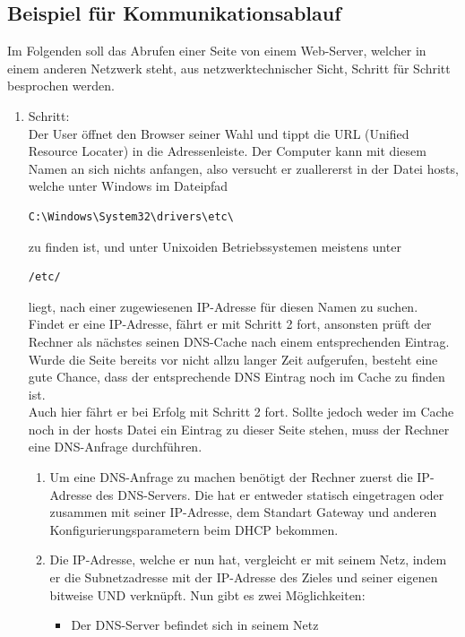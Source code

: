\documentclass[12pt,a4paper]{report}
\begin{document}
\begin{onehalfspace}
\subsection{Beispiel für Kommunikationsablauf}
Im Folgenden soll das Abrufen einer Seite von einem Web-Server, welcher in einem anderen Netzwerk steht, aus netzwerktechnischer Sicht, Schritt für Schritt besprochen werden.\\
\begin{enumerate}
\item Schritt:\\
Der User öffnet den Browser seiner Wahl und tippt die URL (Unified Resource Locater) in die Adressenleiste. Der Computer kann mit diesem Namen an sich nichts anfangen, also versucht er zuallererst in der Datei \glqq hosts\grqq , welche unter Windows im Dateipfad
\begin{lstlisting} 
C:\Windows\System32\drivers\etc\ 
\end{lstlisting} zu finden ist, und unter Unixoiden Betriebssystemen meistens unter 
\begin{lstlisting} 
/etc/
\end{lstlisting} liegt, nach einer zugewiesenen IP-Adresse für diesen Namen zu suchen.\\
Findet er eine IP-Adresse, fährt er mit Schritt 2 fort, ansonsten prüft der Rechner als nächstes seinen DNS-Cache nach einem entsprechenden Eintrag. Wurde die Seite bereits vor nicht allzu langer Zeit aufgerufen, besteht eine gute Chance, dass der entsprechende DNS Eintrag noch im Cache zu finden ist.\\
Auch hier fährt er bei Erfolg mit Schritt 2 fort. Sollte jedoch weder im Cache noch in der hosts Datei ein Eintrag zu dieser Seite stehen, muss der Rechner eine DNS-Anfrage durchführen.\\
\begin{enumerate}
\item Um eine DNS-Anfrage zu machen benötigt der Rechner zuerst die IP-Adresse des DNS-Servers. Die hat er entweder statisch eingetragen oder zusammen mit seiner IP-Adresse, dem Standart Gateway und anderen Konfigurierungsparametern beim DHCP bekommen.
\item Die IP-Adresse, welche er nun hat, vergleicht er mit seinem Netz, indem er die Subnetzadresse mit der IP-Adresse des Zieles und seiner eigenen bitweise UND verknüpft. Nun gibt es zwei Möglichkeiten: 
\begin{itemize}
\item Der DNS-Server befindet sich in seinem Netz

\end{itemize}
\end{enumerate}
\end{enumerate}
\end{onehalfspace}
\end{document}
